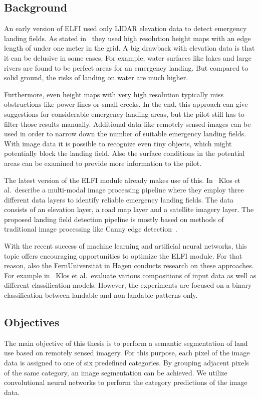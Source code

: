 \subsection{Background}
An early version of ELFI used only LIDAR elevation data to detect emergency landing fields. As stated in~\cite{feu_elfi} they used high resolution height maps with an edge length of under one meter in the grid. A big drawback with elevation data is that it can be delusive in some cases. For example, water surfaces like lakes and large rivers are found to be perfect areas for an emergency landing. But compared to solid ground, the risks of landing on water are much higher.

Furthermore, even height maps with very high resolution typically miss obstructions like power lines or small creeks. In the end, this approach can give suggestions for considerable emergency landing areas, but the pilot still has to filter those results manually. Additional data like remotely sensed images can be used in order to narrow down the number of suitable emergency landing fields. With image data it is possible to recognize even tiny objects, which might potentially block the landing field. Also the surface conditions in the potential areas can be examined to provide more information to the pilot.

The latest version of the ELFI module already makes use of this. In~\cite{elfi_pipeline19} Klos et al.\ describe a multi-modal image processing pipeline where they employ three different data layers to identify reliable emergency landing fields. The data consists of an elevation layer, a road map layer and a satellite imagery layer. The proposed landing field detection pipeline is mostly based on methods of traditional image processing like Canny edge detection~\cite{canny_edge86}.

With the recent success of machine learning and artificial neural networks, this topic offers encouraging opportunities to optimize the ELFI module. For that reason, also the FernUniversität in Hagen conducts research on these approaches. For example in~\cite{elfi_transfer20} Klos et al.\ evaluate various compositions of input data as well as different classification models. However, the experiments are focused on a binary classification between landable and non-landable patterns only.

\subsection{Objectives}
The main objective of this thesis is to perform a semantic segmentation of land use based on remotely sensed imagery. For this purpose, each pixel of the image data is assigned to one of six predefined categories. By grouping adjacent pixels of the same category, an image segmentation can be achieved. We utilize convolutional neural networks to perform the category predictions of the image data.

